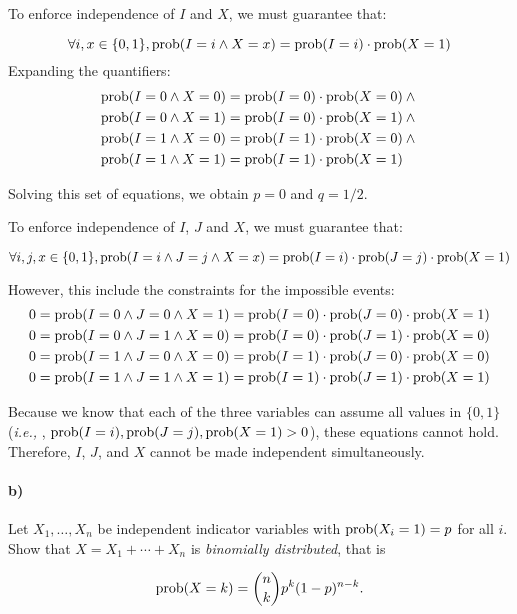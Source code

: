 \documentclass[a4paper]{article}
\newcommand{\ie}{\emph{i.e.,} }
\begin{document}
To enforce independence of $I$ and $X$, we must guarantee that:

$$ \forall i, x \in \{0,1\}, \operatorname{prob}(I = i \wedge X = x) = \operatorname{prob}(I = i) \cdot \operatorname{prob}(X = 1) $$
Expanding the quantifiers:
\begin{align*}
\operatorname{prob}(I = 0 \wedge X = 0) &= \operatorname{prob}(I = 0) \cdot \operatorname{prob}(X = 0) \land{} \\
\operatorname{prob}(I = 0 \wedge X = 1) &= \operatorname{prob}(I = 0) \cdot \operatorname{prob}(X = 1) \land{} \\
\operatorname{prob}(I = 1 \wedge X = 0) &= \operatorname{prob}(I = 1) \cdot \operatorname{prob}(X = 0) \land{} \\
\operatorname{prob}(I = 1 \wedge X = 1) &= \operatorname{prob}(I = 1) \cdot \operatorname{prob}(X = 1)
\end{align*}

Solving this set of equations, we obtain $p = 0$ and $q = 1/2$.

\bigskip
To enforce independence of $I$, $J$ and $X$, we must guarantee that:

$$ \forall i, j, x \in \{0,1\}, \operatorname{prob}(I = i \wedge J = j \wedge X = x) = \operatorname{prob}(I = i) \cdot \operatorname{prob}(J = j) \cdot \operatorname{prob}(X = 1) $$

However, this include the constraints for the impossible events:
\begin{align*}
0 = \operatorname{prob}(I = 0 \wedge J = 0 \wedge X = 1) = \operatorname{prob}(I = 0) \cdot \operatorname{prob}(J = 0) \cdot \operatorname{prob}(X = 1) \\
0 = \operatorname{prob}(I = 0 \wedge J = 1 \wedge X = 0) = \operatorname{prob}(I = 0) \cdot \operatorname{prob}(J = 1) \cdot \operatorname{prob}(X = 0) \\
0 = \operatorname{prob}(I = 1 \wedge J = 0 \wedge X = 0) = \operatorname{prob}(I = 1) \cdot \operatorname{prob}(J = 0) \cdot \operatorname{prob}(X = 0) \\
0 = \operatorname{prob}(I = 1 \wedge J = 1 \wedge X = 1) = \operatorname{prob}(I = 1) \cdot \operatorname{prob}(J = 1) \cdot \operatorname{prob}(X = 1)
\end{align*}

Because we know that each of the three variables can assume all values in $\{0, 1\}$ (\ie, $\operatorname{prob}(I = i), \operatorname{prob}(J = j), \operatorname{prob}(X = 1) > 0$), these equations cannot hold. Therefore, $I$, $J$, and $X$ cannot be made independent simultaneously.

\paragraph{b)} Let $X_1, \ldots, X_n$ be independent indicator variables with $\operatorname{prob}(X_i = 1) = p$ for all $i$. Show that $X = X_1 + \cdots + X_n$ is \emph{binomially distributed}, that is

$$\operatorname{prob}(X = k) = {n \choose k} p^k (1-p)^{n-k}.$$
\end{document}
